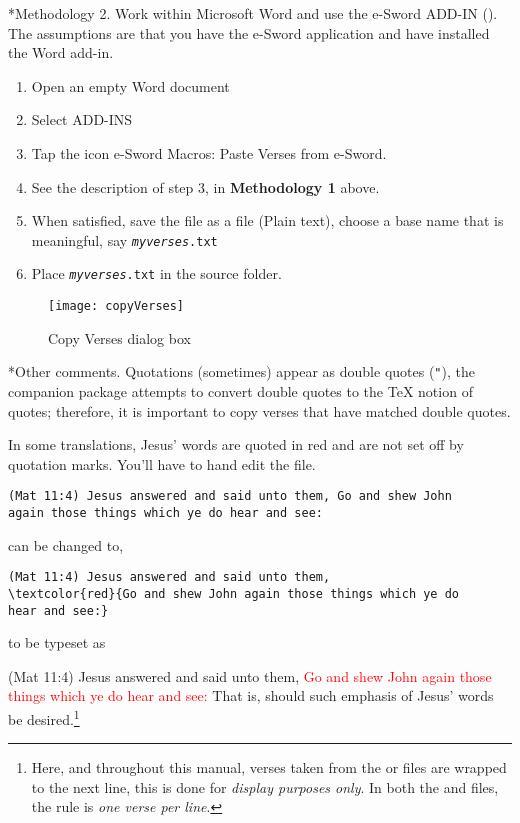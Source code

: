 \documentclass{article}
\makeatletter
\renewcommand*{\theparagraph}{\texorpdfstring{\protect\P\protect\ }{\textparagraph}}
\renewcommand{\paragraph}
    {\renewcommand{\@seccntformat}[1]{\theparagraph}%
    \@startsection{paragraph}{4}{0pt}{6pt}{-3pt}{\color{\aeb@subsubsectioncolor}\bfseries}}
\renewenvironment{quote}[1][]
   {\def\@rgi{#1}\ifx\@rgi\@empty
    \let\rghtm\@empty\else\def\rghtm{\rightmargin\leftmargin}\fi
    \list{}{\rghtm} %
    \item\relax}
   {\endlist}
\edef\amtIndent{\the\parindent}
\makeatother
\begin{document}
    \paragraph*{Methodology 2.} Work within \textsf{Microsoft Word} and use the
    \textsf{e-Sword} ADD-IN (). The
    assumptions are that you have the \textsf{e-Sword} application and have installed
    the \textsf{Word} add-in.
    \begin{enumerate}
    \item Open an empty Word document
    \item Select ADD-INS
    \item Tap the icon e-Sword Macros: Paste Verses from e-Sword.
    \item See the description of step 3, in \textbf{Methodology 1} above.
    \item When satisfied, save the file as a  file (Plain text), choose a
        base name that is meaningful, say \texttt{{\slshape{myverses}}.txt}
    \item Place \texttt{{\slshape{myverses}}.txt} in the source folder.
    \end{enumerate}

\begin{figure}[htb]\centering
  \texttt{[image: copyVerses]}
  \caption{\textsf{Copy Verses} dialog box}\label{fig:cpyVrs}
\end{figure}

    \paragraph*{Other comments.} Quotations (sometimes) appear as double quotes
    (\texttt{"}), the companion package  attempts to convert
    double quotes to the {\TeX} notion of quotes; therefore, it is important
    to copy verses that have matched double quotes.

    In some translations, Jesus' words are quoted in red and are not set off
    by quotation marks. You'll have to hand edit the  file.
\begin{Verbatim}[xleftmargin=\amtIndent]
(Mat 11:4) Jesus answered and said unto them, Go and shew John
again those things which ye do hear and see:
\end{Verbatim}
    can be changed to,
\begin{Verbatim}[xleftmargin=\amtIndent]
(Mat 11:4) Jesus answered and said unto them,
\textcolor{red}{Go and shew John again those things which ye do
hear and see:}
\end{Verbatim}
to be typeset as
    \begin{quote}
    (Mat 11:4) Jesus answered and said unto them, \textcolor{red}{Go and shew John
    again those things which ye do hear and see:}
    \end{quote}
    That is, should such emphasis of Jesus' words be desired.\footnote{Here,
    and throughout this manual, verses taken from the  or 
    files are wrapped to the next line, this is done for \emph{display
    purposes only}. In both the  and  files, the rule is
    \emph{one verse per line}.}
\end{document}
